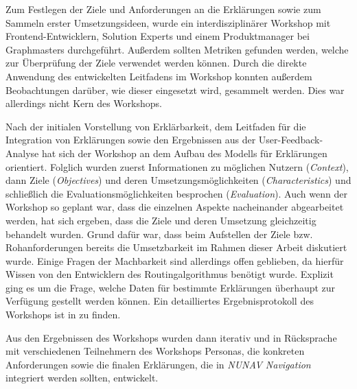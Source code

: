 Zum Festlegen der Ziele und Anforderungen an die Erklärungen sowie zum Sammeln erster Umsetzungsideen, wurde ein interdisziplinärer Workshop mit Frontend-Entwicklern, \glqq Solution Experts\grqq{} und einem Produktmanager bei Graphmasters durchgeführt. Außerdem sollten Metriken gefunden werden, welche zur Überprüfung der Ziele verwendet werden können. Durch die direkte Anwendung des entwickelten Leitfadens im Workshop konnten außerdem Beobachtungen darüber, wie dieser eingesetzt wird, gesammelt werden. Dies war allerdings nicht Kern des Workshops. 

Nach der initialen Vorstellung von Erklärbarkeit, dem Leitfaden für die Integration von Erklärungen sowie den Ergebnissen aus der User-Feedback-Analyse hat sich der Workshop an dem Aufbau des Modells für Erklärungen orientiert. Folglich wurden zuerst Informationen zu möglichen Nutzern (\textit{Context}), dann Ziele (\textit{Objectives}) und deren Umsetzungsmöglichkeiten (\textit{Characteristics}) und schließlich die Evaluationsmöglichkeiten besprochen (\textit{Evaluation}). Auch wenn der Workshop so geplant war, dass die einzelnen Aspekte nacheinander abgearbeitet werden, hat sich ergeben, dass die Ziele und deren Umsetzung gleichzeitig behandelt wurden. Grund dafür war, dass beim Aufstellen der Ziele bzw. Rohanforderungen bereits die Umsetzbarkeit im Rahmen dieser Arbeit diskutiert wurde. Einige Fragen der Machbarkeit sind allerdings offen geblieben, da hierfür Wissen von den Entwicklern des Routingalgorithmus benötigt wurde. Explizit ging es um die Frage, welche Daten für bestimmte Erklärungen überhaupt zur Verfügung gestellt werden können. Ein detailliertes Ergebnisprotokoll des Workshops ist in  zu finden.

Aus den Ergebnissen des Workshops wurden dann iterativ und in Rücksprache mit verschiedenen Teilnehmern des Workshops Personas, die konkreten Anforderungen sowie die finalen Erklärungen, die in \textit{NUNAV Navigation} integriert werden sollten, entwickelt.